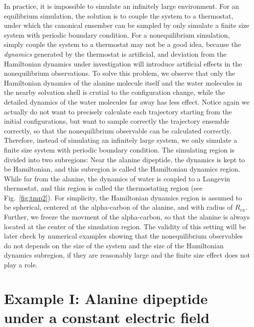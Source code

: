 \documentclass[aip,jcp,a4paper,preprint,onecolumn]{revtex4-1}
\begin{document}
In practice, it is impossible to simulate an infinitely large
environment.  For an equilibrium simulation, the solution is to couple
the system to a thermostat, under which the canonical ensember can be
sampled by only simulate a finite size system with periodic boundary
condition. For a nonequilibrium simulation, simply couple the system
to a thermostat may not be a good idea, because the \emph{dynamics}
generated by the thermostat is artificial, and deviation from the
Hamiltonian dynamics under investigation will introduce artificial
effects in the nonequilibrium observations. To solve this problem, we
observe that only the Hamiltonian dynamics of the alanine molecule
itself and the water molecules in the nearby solvation shell is
crutial to the configuration change, while the detailed dynamics of
the water molecules far away has less effect. Notice again we actually
do not want to precisely calculate each trajectory starting from the
initial configurations, but want to sample correctly the trajectory
ensemble correctly, so that the nonequilibrium observable can be
calculated correctly.  Therefore, instead of simulating an infinitely
large system, we only simulate a finite size system with periodic
boundary condition. The simulating region is divided into two
subregions: Near the alanine dipeptide, the dynamics is kept to be
Hamiltonian, and this subregion is called the Hamiltonian dynamics
region. While far from the alanine, the dynamics of water is coupled
to a Langevin thermostat, and this region is called the thermostating
region (see Fig.~\ref{fig:tmp2}).  For simplicity, the Hamiltonian
dynamics region is assumed to be spherical, centered at the
alpha-carbon of the alanine, and with radius of $R_{ex}$.  Further, we
freeze the movment of the alpha-carbon, so that the alanine is always
located at the center of the simulation region.  The validity of this
setting will be later check by numerical examples showing that the
nonequilibrium observables do not depends on the size of the system
and the size of the Hamiltonian dynamics subregion, if they are
reasonably large and the finite size effect does not play a role.


\section{Example I: Alanine dipeptide
  under a constant electric field}
\end{document}
